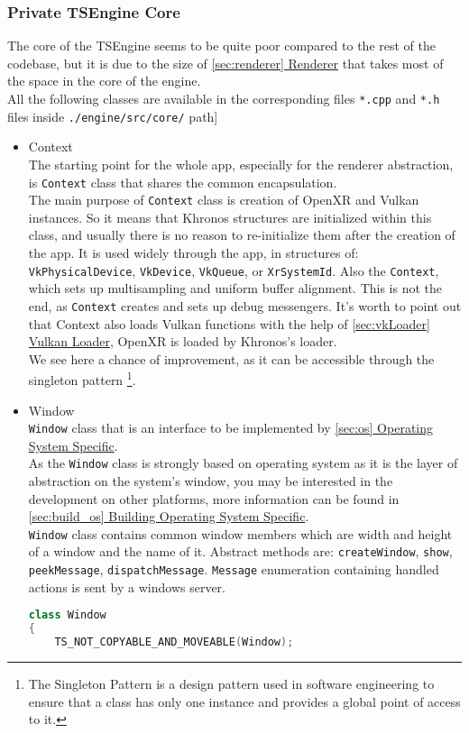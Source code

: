 \subsubsection{Private TSEngine Core}
\hspace{\parindent} The core of the TSEngine seems to be quite poor compared to the rest of the codebase, but it is due to the size of \hyperref[sec:renderer]{\ref*{sec:renderer} Renderer} that takes most of the space in the core of the engine.\\
All the following classes are available in the corresponding files \texttt{*.cpp} and \texttt{*.h} files inside \texttt{./engine/src/core/} path]\\
\begin{itemize}
    \item Context\\
    \label{context}
    The starting point for the whole app, especially for the renderer abstraction, is \texttt{Context} class that shares the common encapsulation.\\
    The main purpose of \texttt{Context} class is creation of OpenXR and Vulkan instances. So it means that Khronos structures are initialized within this class, and usually there is no reason to re-initialize them after the creation of the app. It is used widely through the app, in structures of: \texttt{VkPhysicalDevice}, \texttt{VkDevice}, \texttt{VkQueue}, or \texttt{XrSystemId}. Also the \texttt{Context}, which sets up multisampling and uniform buffer alignment. This is not the end, as \texttt{Context} creates and sets up debug messengers.
    It's worth to point out that Context also loads Vulkan functions with the help of \hyperref[sec:vkLoader]{\ref*{sec:vkLoader} Vulkan Loader}, OpenXR is loaded by Khronos's loader.\\
    We see here a chance of improvement, as it can be accessible through the singleton pattern
    \footnote{The Singleton Pattern is a design pattern used in software engineering to ensure that a class has only one instance and provides a global point of access to it.}.
    \item Window\\
    \label{window}
    \texttt{Window} class that is an interface to be implemented by \hyperref[sec:os]{\ref*{sec:os} Operating System Specific}.\\
    As the \texttt{Window} class is strongly based on operating system as it is the layer of abstraction on the system's window, you may be interested in the development on other platforms, more information can be found in \hyperref[sec:build_os]{\ref*{sec:build_os} Building Operating System Specific}.\\
    \texttt{Window} class contains common window members which are width and height of a window and the name of it. Abstract methods are: \texttt{createWindow}, \texttt{show}, \texttt{peekMessage}, \texttt{dispatchMessage}. \texttt{Message} enumeration containing handled actions is sent by a windows server. 
\begin{lstlisting}[language=c++, caption=Engine window interface (./engine/src/core/window.h)]
class Window
{
    TS_NOT_COPYABLE_AND_MOVEABLE(Window);


\end{lstlisting}
\end{itemize}
